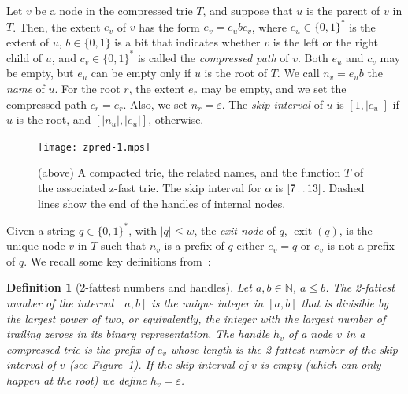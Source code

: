 \documentclass[a4paper,11pt]{article}
\newtheorem{definition}[theorem]{Definition}
\newcommand{\eps}{\varepsilon}
\newcommand{\N}{\mathbb{N}}
\newcommand{\?}{\mskip1.5mu}
\def\..{\,\mathpunct{\ldotp\ldotp}} %
\DeclareMathOperator{\exit}{exit}
\begin{document}
Let $v$ be a node in the compressed trie $T$,
and suppose that $u$ is the parent of $v$ in
$T$. Then, the extent $e_v$ of $v$ has the
form $e_v = e_ubc_v$, where $e_u \in \{0, 1\}^*$
is the extent of $u$, $b \in \{0,1\}$ is a bit that
indicates whether $v$ is the left or the right child
of $u$, and $c_v \in \{0, 1\}^*$ is called the \emph{compressed
path} of $v$. Both $e_u$ and $c_v$ may be empty, but $e_u$
can be empty only if $u$ is the root of $T$. 
We call $n_v = e_ub$ the \emph{name} of $u$.
For the root $r$, the extent $e_r$ may be empty, and we set
the compressed path $c_r = e_r$. Also, we set $n_r = \eps$.
The \emph{skip interval} of $u$ is $[1, |e_u|]$ if $u$ is the
root, and $[|n_u|, |e_u|]$, otherwise.

\begin{figure}[t]
\centering
\texttt{[image: zpred-1.mps]}\qquad{}
\caption{\label{fig:ztrie}(above) A compacted trie, the 
related names, and the function $T$ of the associated 
z-fast trie. The skip interval for $\alpha$ is $[7\..13]$. 
Dashed lines show the end of the handles of internal nodes.}
\end{figure}

Given a string $q \in \{0, 1\}^*$, with $|q| \leq w$, the 
\emph{exit node} of $q$, $\exit(q)$, is the unique node
$v$ in $T$ such that $n_v$ is a prefix of $q$ either
$e_v = q$ or $e_v$ is not a prefix of $q$.
We recall some key definitions from~\cite{BelazzouguiBoPaVi09}:

\begin{definition}[2-fattest numbers and handles] 
\label{def:twofattest}
Let $a, b \in \N$, $a \leq b$.
The \emph{2-fattest number} of the interval
$[a, b]$ is the unique integer in $[a, b]$ that is
divisible by the largest power of two, or equivalently, 
the integer with the largest number of trailing zeroes in its 
binary representation. The \emph{handle}
$h_v$ of a node $v$ in a compressed trie is the prefix of 
$e_v$ whose length is the 2-fattest number of the skip interval of $v$
(see Figure~\ref{fig:ztrie}). If the skip interval of $v$ is empty 
(which can only happen at the root) we define $h_v = \eps$.
\end{definition}
\end{document}

